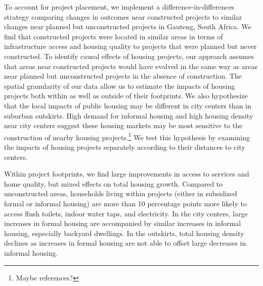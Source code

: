 \documentclass[12pt]{article}
\begin{document}
To account for project placement, we implement a difference-in-differences strategy comparing changes in outcomes near constructed projects to similar changes near planned but unconstructed projects in Gauteng, South Africa.  We find that constructed projects were located in similar areas in terms of infrastructure access and housing quality to projects that were planned but never constructed.  To identify causal effects of housing projects, our approach assumes that areas near constructed projects would have evolved in the same way as areas near planned but unconstructed projects in the absence of construction.  The spatial granularity of our data allow us to estimate the impacts of housing projects both within as well as outside of their footprints.  We also hypothesize that the local impacts of public housing may be different in city centers than in suburban outskirts.  High demand for informal housing and high housing density near city centers suggest these housing markets may be most sensitive to the construction of nearby housing projects.\footnote{Maybe references?}  We test this hypothesis by examining the impacts of housing projects separately according to their distances to city centers.






Within project footprints, we find large improvements in access to services and home quality, but mixed effects on total housing growth. Compared to unconstructed areas, households living within projects (either in subsidized formal or informal housing) are more than 10 percentage points more likely to access flush toilets, indoor water taps, and electricity.  In the city centers, large increases in formal housing are accompanied by similar increases in informal housing, especially backyard dwellings.  In the outskirts, total housing density declines as increases in formal housing are not able to offset large decreases in informal housing.
\end{document}
